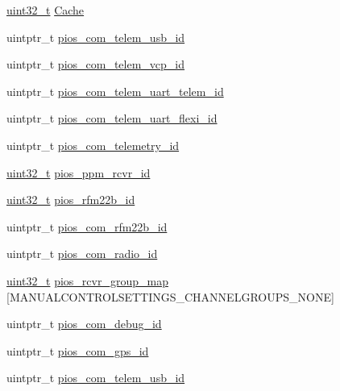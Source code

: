 \begin{DoxyCompactItemize}
\hyperlink{stdint_8h_a435d1572bf3f880d55459d9805097f62}{uint32\-\_\-t} \hyperlink{group___open_pilot_core_gaef8c3e152589675df7f5b49cc1ba7ffd}{Cache}
\item 
uintptr\-\_\-t \hyperlink{group___open_pilot_core_ga513cc36d72b76de2fcb75ff233a79a4a}{pios\-\_\-com\-\_\-telem\-\_\-usb\-\_\-id}
\item 
uintptr\-\_\-t \hyperlink{group___open_pilot_core_gaad17224bb36a5f3c73a716320de2b604}{pios\-\_\-com\-\_\-telem\-\_\-vcp\-\_\-id}
\item 
uintptr\-\_\-t \hyperlink{group___open_pilot_core_ga921f0eb0351c5bfb72fa30333cd8dbe1}{pios\-\_\-com\-\_\-telem\-\_\-uart\-\_\-telem\-\_\-id}
\item 
uintptr\-\_\-t \hyperlink{group___open_pilot_core_ga756d20d3ee409603f69b54c0bf4c5584}{pios\-\_\-com\-\_\-telem\-\_\-uart\-\_\-flexi\-\_\-id}
\item 
uintptr\-\_\-t \hyperlink{group___open_pilot_core_gac90e37dffee878bd2e1e9d2020b6a1de}{pios\-\_\-com\-\_\-telemetry\-\_\-id}
\item 
\hyperlink{stdint_8h_a435d1572bf3f880d55459d9805097f62}{uint32\-\_\-t} \hyperlink{group___open_pilot_core_ga6338d4e922eaddddb7e8cb253a901907}{pios\-\_\-ppm\-\_\-rcvr\-\_\-id}
\item 
\hyperlink{stdint_8h_a435d1572bf3f880d55459d9805097f62}{uint32\-\_\-t} \hyperlink{group___open_pilot_core_ga1e0b7d2eb8b8640e07daa1f381780972}{pios\-\_\-rfm22b\-\_\-id}
\item 
uintptr\-\_\-t \hyperlink{group___open_pilot_core_ga960a23c3c0c4fd41826d65e01651b737}{pios\-\_\-com\-\_\-rfm22b\-\_\-id}
\item 
uintptr\-\_\-t \hyperlink{group___open_pilot_core_ga7bf37c2a11a82f3cee715b9e09638dce}{pios\-\_\-com\-\_\-radio\-\_\-id}
\item 
\hyperlink{stdint_8h_a435d1572bf3f880d55459d9805097f62}{uint32\-\_\-t} \hyperlink{group___open_pilot_core_ga6c6cfc16eb738e47c123298e062297e2}{pios\-\_\-rcvr\-\_\-group\-\_\-map} \mbox{[}M\-A\-N\-U\-A\-L\-C\-O\-N\-T\-R\-O\-L\-S\-E\-T\-T\-I\-N\-G\-S\-\_\-\-C\-H\-A\-N\-N\-E\-L\-G\-R\-O\-U\-P\-S\-\_\-\-N\-O\-N\-E\mbox{]}
\item 
uintptr\-\_\-t \hyperlink{group___open_pilot_core_ga14dc9e3d330b80a37a9699c2112358e0}{pios\-\_\-com\-\_\-debug\-\_\-id}
\item 
uintptr\-\_\-t \hyperlink{group___open_pilot_core_ga05dca72c42c6c2b33fa62b8ee0fcb2ea}{pios\-\_\-com\-\_\-gps\-\_\-id}
\item 
uintptr\-\_\-t \hyperlink{group___open_pilot_core_ga513cc36d72b76de2fcb75ff233a79a4a}{pios\-\_\-com\-\_\-telem\-\_\-usb\-\_\-id}

\end{DoxyCompactItemize}
